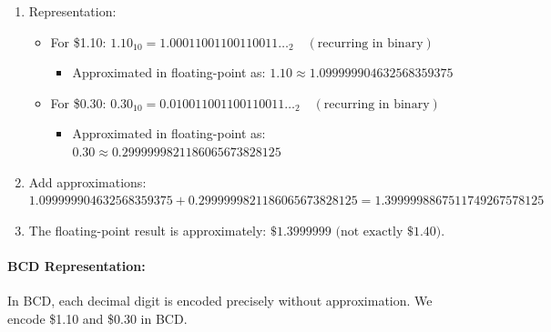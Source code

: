 \begin{enumerate}
    \item Representation:
    \begin{itemize}
        \item  For \$1.10:
     \(
     1.10_{10} = 1.00011001100110011\ldots_2 \quad (\text{recurring in binary})
     \)    
     \begin{itemize}

     \item Approximated in floating-point as:
     \(
     1.10 \approx 1.099999904632568359375
     \)
    \end{itemize}
    
   \item For \$0.30:
     \(
     0.30_{10} = 0.010011001100110011\ldots_2 \quad (\text{recurring in binary})
     \)
     \begin{itemize}
     \item Approximated in floating-point as:
     \(
     0.30 \approx 0.2999999821186065673828125
     \)
     \end{itemize}     
    \end{itemize}

    \item Add approximations:
   \(
   1.099999904632568359375 + 0.2999999821186065673828125 =  
   1.3999998867511749267578125
   \)

    \item The floating-point result is approximately:
   \(
   \text{\$1.3999999 (not exactly \$1.40)}.
   \)
    
\end{enumerate}

\paragraph{BCD Representation:}
In BCD, each decimal digit is encoded precisely without approximation. We encode \$1.10 and \$0.30 in BCD.

